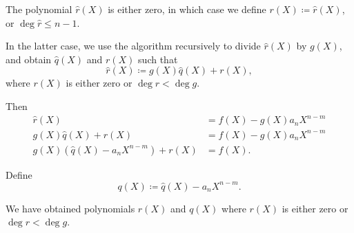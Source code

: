\begin{algorithm}
\begin{thmenum}
    The polynomial \( \hat r(X) \) is either zero, in which case we define \( r(X) \coloneqq \hat r(X) \), or \( \deg \hat r \leq n - 1 \).

    In the latter case, we use the algorithm recursively to divide \( \hat r(X) \) by \( g(X) \), and obtain \( \hat q(X) \) and \( r(X) \) such that
    \begin{equation*}
      \hat r(X) \coloneqq g(X) \hat q(X) + r(X),
    \end{equation*}
    where \( r(X) \) is either zero or \( \deg r < \deg g \).

    Then
    \begin{align*}
      \hat r(X)                                         &= f(X) - g(X) a_n X^{n-m} \\
      g(X) \hat q(X) + r(X)                             &= f(X) - g(X) a_n X^{n-m} \\
      g(X) \left(\hat q(X) - a_n X^{n-m} \right) + r(X) &= f(X).
    \end{align*}

    Define
    \begin{equation*}
      q(X) \coloneqq \hat q(X) - a_n X^{n-m}.
    \end{equation*}

    We have obtained polynomials \( r(X) \) and \( q(X) \) where \( r(X) \) is either zero or \( \deg r < \deg g \).
  \end{thmenum}
\end{algorithm}
